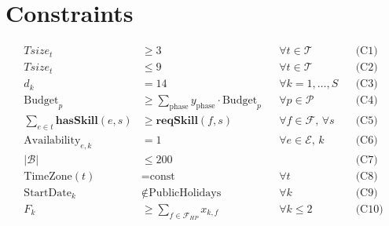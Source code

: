 \documentclass{article}
\begin{document}
\section*{Constraints}
\begin{align}
  Tsize_t &\ge 3 &&\forall t\in\mathcal{T} &&\text{(C1)}\\
  Tsize_t &\le 9 &&\forall t\in\mathcal{T} &&\text{(C2)}\\
  d_k &= 14 &&\forall k=1,\dots,S &&\text{(C3)}\\
  \text{Budget}_p &\ge \sum_{\text{phase}} y_{\text{phase}}\cdot \text{Budget}_p &&\forall p\in\mathcal{P} &&\text{(C4)}\\
  \sum_{e\in t} \mathbf{hasSkill}(e,s) 
    &\ge \mathbf{reqSkill}(f,s)
    &&\forall f\in\mathcal{F},\,\forall s &&\text{(C5)}\\
  \text{Availability}_{e,k} &= 1 &&\forall e\in\mathcal{E},\,k &&\text{(C6)}\\
  |\mathcal{B}| &\le 200 &&&&\text{(C7)}\\
  \text{TimeZone}(t) &= \text{const} &&\forall t &&\text{(C8)}\\
  \text{StartDate}_k &\notin \text{PublicHolidays} &&\forall k &&\text{(C9)}\\
  F_k &\ge \sum_{f\in \mathcal{F}_{HP}} x_{k,f}
    &&\forall k\le 2 &&\text{(C10)}
\end{align}
\end{document}
